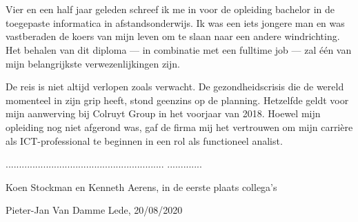 
\chapter*{}
\label{ch:voorwoord}


Vier en een half jaar geleden schreef ik me in voor de opleiding bachelor in de toegepaste informatica in afstandsonderwijs. Ik was een iets jongere man en was vastberaden de koers van mijn leven om te slaan naar een andere windrichting. Het behalen van dit diploma — in combinatie met een fulltime job — zal één van mijn belangrijkste verwezenlijkingen zijn.

De reis is niet altijd verlopen zoals verwacht. De gezondheidscrisis die de wereld momenteel in zijn grip heeft, stond geenzins op de planning. Hetzelfde geldt voor mijn aanwerving bij Colruyt Group in het voorjaar van 2018. Hoewel mijn opleiding nog niet afgerond was, gaf de firma mij het vertrouwen om mijn carrière als ICT-professional te beginnen in een rol als functioneel analist.

...........................................................
.............

Koen Stockman en Kenneth Aerens, in de eerste plaats collega's

\begin{flushright}
Pieter-Jan Van Damme\linebreak
Lede, 20/08/2020
\end{flushright}